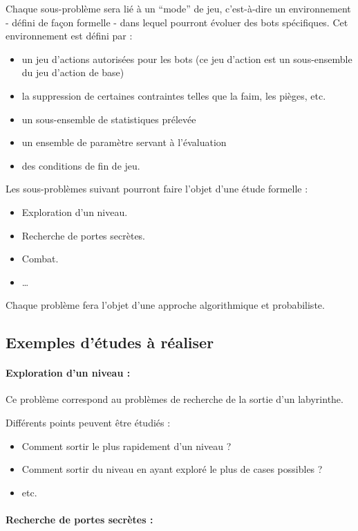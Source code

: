 \documentclass[12pt]{article}
\begin{document}
Chaque sous-problème sera lié à un ``mode'' de jeu, c'est-à-dire un environnement - défini de façon formelle - dans lequel pourront évoluer des bots spécifiques. Cet environnement est défini par : 
\begin{itemize}
	\item un jeu d'actions autorisées pour les bots (ce jeu d'action est un sous-ensemble du jeu d'action de base) 
	\item la suppression de certaines contraintes telles que la faim, les pièges, etc. 
	\item un sous-ensemble de statistiques prélevée 
	\item un ensemble de paramètre servant à l'évaluation 
	\item des conditions de fin de jeu.
\end{itemize}

Les sous-problèmes suivant pourront faire l'objet d'une étude formelle : 
\begin{itemize}
	\item Exploration d'un niveau.
	\item Recherche de portes secrètes.
	\item Combat.
	\item \ldots
\end{itemize}

Chaque problème fera l'objet d'une approche algorithmique et probabiliste.

\subsection{Exemples d'études à réaliser}

\paragraph{Exploration d'un niveau :}

Ce problème correspond au problèmes de recherche de la sortie d'un labyrinthe.

Différents points peuvent être étudiés : 
\begin{itemize}
	\item Comment sortir le plus rapidement d'un niveau ? 
	\item Comment sortir du niveau en ayant exploré le plus de cases possibles ? 
	\item etc.
\end{itemize}


\paragraph{Recherche de portes secrètes :}
\end{document}
